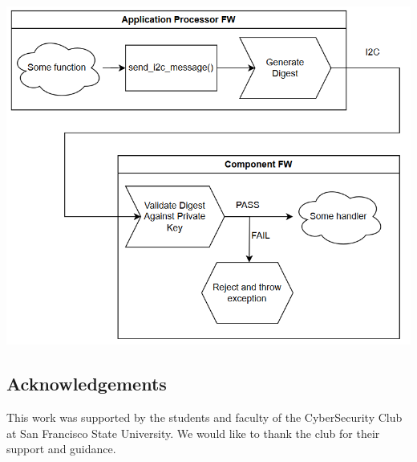 \documentclass{prace}
\begin{document}
\includegraphics[scale=0.5]{./diagramSR5.png}

%


\subsection*{Acknowledgements}
This work was supported by the students and faculty of the CyberSecurity Club at San Francisco State University. We would like to thank the club for their support and guidance.

\end{document}

